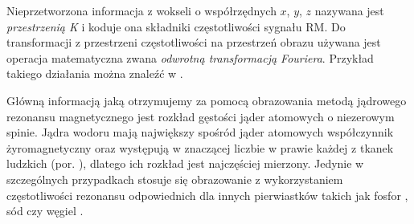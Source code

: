 Nieprzetworzona informacja z wokseli o współrzędnych $x$, $y$, $z$ nazywana jest \textit{przestrzenią K} i koduje ona składniki częstotliwości sygnału RM. Do transformacji \linebreak z przestrzeni częstotliwości na przestrzeń obrazu używana jest operacja matematyczna zwana \textit{odwrotną transformacją Fouriera}. Przykład takiego działania można znaleźć w \cite{Q&AinMRI}.

Główną informacją jaką otrzymujemy za pomocą obrazowania metodą jądrowego rezonansu magnetycznego jest rozkład gęstości jąder atomowych o niezerowym spinie. Jądra wodoru mają największy spośród jąder atomowych współczynnik żyromagnetyczny oraz występują w znaczącej liczbie w prawie każdej z tkanek ludzkich (por. \cite{RM2015}), dlatego ich rozkład jest najczęściej mierzony. Jedynie w szczególnych przypadkach stosuje się obrazowanie z wykorzystaniem częstotliwości rezonansu odpowiednich dla innych pierwiastków takich jak fosfor \cite{Sun2016}, sód \cite{Summers1991} czy węgiel \cite{Dria2002}. 

